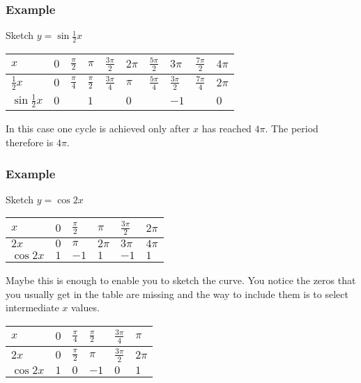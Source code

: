 \subsubsection{Example}
Sketch $y =\sin  \frac{1}{2} x$ 


\begin{tabular}[c]{|l|l|l|l|l|l|l|l|l|l|}\hline
	$x$  & $0$  & $\frac{\pi }{2}$  & $\pi $  & $\frac{3 \pi }{2}$  & $2 \pi $  & $\frac{5 \pi }{2}$  & $3 \pi $  & $\frac{7 \pi }{2}$  & $4 \pi $  \\
	\hline
	$\frac{1}{2} x$  & $0$  & $\frac{\pi }{4}$  & $\frac{\pi }{2}$  & $\frac{3 \pi }{4}$  & $\pi $  & $\frac{5 \pi }{4}$  & $\frac{3 \pi }{2}$  & $\frac{7 \pi }{4}$  & $2 \pi $  \\
	\hline
	$\sin  \frac{1}{2} x$  & $0$  &  & $1$  &  & $0$  &  & $ -1$  &  & $0$  \\
	\hline
\end{tabular}

In this case one cycle is achieved only after $x$ has reached $4 \pi $. The period therefore is $4 \pi $. 


\setlength\fboxrule{0.01in}\setlength\fboxsep{0.2in}


\subsubsection{Example}
Sketch $y =\cos  2 x$ 


\begin{tabular}[c]{|l|l|l|l|l|l|}\hline
	$x$  & $0$  & $\frac{\pi }{2}$  & $\pi $  & $\frac{3 \pi }{2}$  & $2 \pi $  \\
	\hline
	$2 x$  & $0$  & $\pi $  & $2 \pi $  & $3 \pi $  & $4 \pi $  \\
	\hline
	$\cos  2 x$  & $1$  & $ -1$  & $1$  & $ -1$  & $1$  \\
	\hline
\end{tabular}

Maybe this is enough to enable you to sketch the curve. You notice the zeros that you usually get
in the table are missing and the way to include them is to select intermediate $x$ values. 


\begin{tabular}[c]{|l|l|l|l|l|l|}\hline
	$x$  & $0$  & $\frac{\pi }{4}$  & $\frac{\pi }{2}$  & $\frac{3 \pi }{4}$  & $\pi $  \\
	\hline
	$2 x$  & $0$  & $\frac{\pi }{2}$  & $\pi $  & $\frac{3 \pi }{2}$  & $2 \pi $  \\
	\hline
	$\cos  2 x$  & $1$  & $0$  & $ -1$  & $0$  & $1$  \\
	\hline
\end{tabular}


